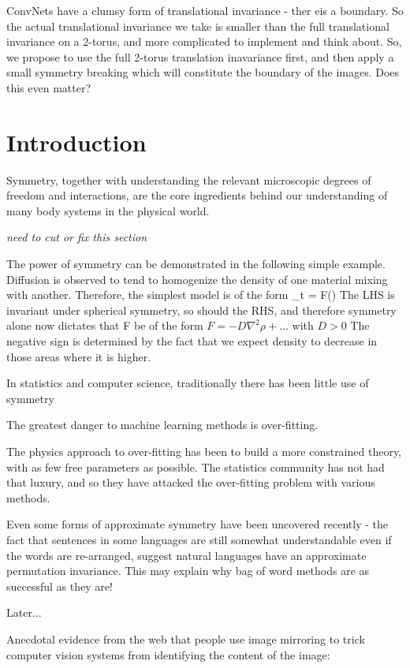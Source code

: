 \documentclass[twocolumn, prl]{revtex4-1}
\begin{document}
ConvNets have a clumsy form of translational invariance - ther eis a boundary. So the actual translational invariance we take is smaller than the full translational invariance on a 2-torus, and more complicated to implement and think about. So, we propose to use the full 2-torus translation inavariance first, and then apply a small symmetry breaking which will constitute the boundary of the images. Does this even matter?



\section{Introduction}
\label{Sec:Intro}

Symmetry, together with understanding the relevant microscopic degrees of freedom and interactions, are the core ingredients behind our understanding of many body systems in the physical world.

\emph{need to cut or fix this section}

The power of symmetry can be demonstrated in the following simple example. Diffusion is observed to tend to homogenize the density of one material mixing with another. Therefore, the simplest model is of the form
\be
\partial_t \rho = F(\nabla \rho)
\ee
The LHS is invariant under spherical symmetry, so should the RHS, and therefore
symmetry alone now dictates that F be of the form $F = - D \nabla^2 \rho + \ldots$ with $D>0$
The negative sign is determined by the fact that we expect density to decrease in those areas where it is higher.


In statistics and computer science, traditionally there has been little use of symmetry


The greatest danger to machine learning methods is over-fitting.


The physics approach to over-fitting has been to build a more constrained theory, with as few free parameters as possible. The statistics community has not had that luxury, and so they have attacked the over-fitting problem with various methods.

Even some forms of approximate symmetry have been uncovered recently - the fact that sentences in some languages are still somewhat understandable even if the words are re-arranged, suggest natural languages have an approximate permutation invariance. This may explain why bag of word methods are as successful as they are!

Later...

Anecdotal evidence from the web that people use image mirroring to trick computer vision systems from identifying the content of the image:
\end{document}
